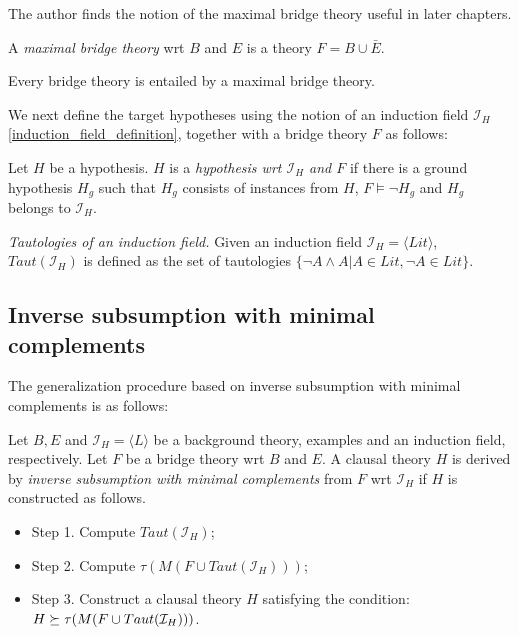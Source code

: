 The author finds the notion of the maximal bridge theory useful in later chapters.
\begin{defn}\label{maximal_bridge_theory_definition}
A \emph{maximal bridge theory} wrt $B$ and $E$ is a theory $F = B \cup \bar{E}$.
\end{defn}
\begin{remark}
Every bridge theory is entailed by a maximal bridge theory.
\end{remark}

We next define the target hypotheses using the notion of an induction field $\mathcal{I}_H$\ref{induction_field_definition}, together with a bridge theory $F$ as follows:

\begin{defn}\label{definition_hypothesis_wrt_induction_field_bridge_theory}
Let $H$ be a hypothesis. $H$ is a \emph{hypothesis wrt $\mathcal{I}_H$ and $F$} if there is a ground hypothesis $H_g$ such that $H_g$ consists of instances from $H$,
$F \models \neg H_g$ and $H_g$ belongs to $\mathcal{I}_H$.
\end{defn}

\begin{defn}\emph{Tautologies of an induction field.}
Given an induction field $\mathcal{I}_H = \langle Lit \rangle$, $Taut(\mathcal{I}_H)$ is defined
as the set of tautologies $\{\neg A \land A | A \in Lit, \neg A \in Lit\}$.
\end{defn}

\subsection{Inverse subsumption with minimal complements}\label{subsec:inverse_subsumption_with_minimal_complements}
The generalization procedure based on inverse subsumption with minimal complements is as follows:

\begin{defn}\label{inverse_subsumption_with_minimal_complements_algorithm}
Let $B, E$ and $\mathcal{I}_H = \langle L \rangle$ be a background theory, examples and an induction
field, respectively. Let $F$ be a bridge theory wrt $B$ and $E$. A clausal theory $H$ is derived
by \emph{inverse subsumption with minimal complements} from $F$ wrt $\mathcal{I}_H$ if $H$ is constructed as follows.
\begin{itemize}
\item Step 1. Compute $Taut(\mathcal{I}_H)$;
\item Step 2. Compute $\tau(M(F \cup Taut(\mathcal{I}_H)))$;
\item Step 3. Construct a clausal theory $H$ satisfying the condition:
$H \succeq \tau(M(F \cup Taut(\mathcal{I}_H)))$.
\end{itemize}
\end{defn}

